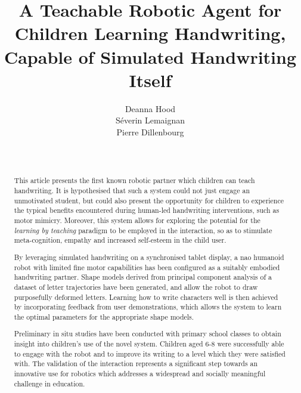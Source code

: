 \documentclass{sig-alternate}
\title{\LARGE \bf
A Teachable Robotic Agent for Children Learning Handwriting, Capable of Simulated Handwriting Itself %
}
\author{
\alignauthor
Deanna Hood\\
Séverin Lemaignan\\
Pierre Dillenbourg\\
   \affaddr{Computer-Human Interaction in Learning and Instruction Laboratory (CHILI)}\\
   \affaddr{École Polytechnique Fédérale\\ de Lausanne (EPFL)}\\
   \email{firstname.lastname@epfl.ch}
}
\begin{document}
\maketitle

\begin{abstract}




This article presents the first known robotic partner which children can teach handwriting. It is
hypothesised that such a system could not just engage an unmotivated student,
but could also present the opportunity for children to experience the typical
benefits encountered during human-led handwriting interventions, such as motor
mimicry. Moreover, this system allows for exploring the potential for the
\emph{learning by teaching} paradigm to be employed in the interaction, so as to
stimulate meta-cognition, empathy and increased self-esteem in the child user. 

By leveraging simulated handwriting on a synchronised tablet display, a {\sc nao}
humanoid robot with limited fine motor capabilities has been configured as a
suitably embodied handwriting partner. Shape models derived from principal
component analysis of a dataset of letter trajectories have been generated, and allow
the robot to draw purposefully deformed letters. Learning how to write
characters well is then achieved by incorporating feedback from user
demonstrations, which allows the system to learn the optimal parameters for the
appropriate shape models. 

Preliminary in situ studies have been conducted with primary school classes to obtain
insight into children's use of the novel system. 
Children aged 6-8 were successfully able to engage with the robot and to improve its 
writing to a level which they were satisfied with. The validation of the interaction
represents a significant step towards an innovative use for robotics which addresses a
widespread and socially meaningful challenge in education. 


\end{abstract}
\end{document}
